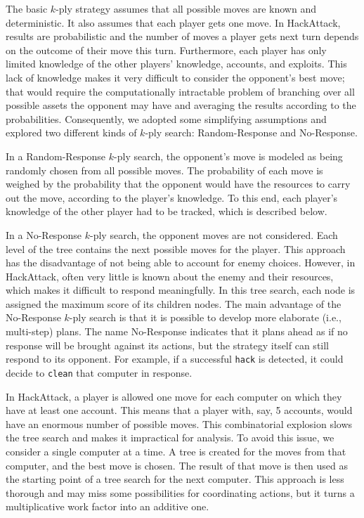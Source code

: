 The basic $k$-ply strategy assumes that all possible moves are known and deterministic. It also assumes that each player gets one move. In HackAttack, results are probabilistic and the number of moves a player gets next turn depends on the outcome of their move this turn. Furthermore, each player has only limited knowledge of the other players' knowledge, accounts, and exploits. This lack of knowledge makes it very difficult to consider the opponent's best move; that would require the computationally intractable problem of branching over all possible assets the opponent may have and averaging the results according to the probabilities. Consequently, we adopted some simplifying assumptions and explored two different kinds of $k$-ply search: Random-Response and No-Response.

In a Random-Response $k$-ply search, the opponent's move is modeled as being randomly chosen from all possible moves. The probability of each move is weighed by the probability that the opponent would have the resources to carry out the move, according to the player's knowledge. To this end, each player's knowledge of the other player had to be tracked, which is described below.

In a No-Response $k$-ply search, the opponent moves are not considered. Each level of the tree contains the next possible moves for the player. This approach has the disadvantage of not being able to account for enemy choices. However, in HackAttack, often very little is known about the enemy and their resources, which makes it difficult to respond meaningfully. In this tree search, each node is assigned the maximum score of its children nodes. The main advantage of the No-Response $k$-ply search is that it is possible to develop more elaborate (i.e., multi-step) plans.
The name No-Response indicates that it plans ahead as if no response will be brought against its actions, but the strategy itself can still respond to its opponent. 
For example, if a successful {\tt hack} is detected, it could decide to {\tt clean} that computer in response.
 
In HackAttack, a player is allowed one move for each computer on which they have at least one account. This means that a player with, say, 5 accounts, would have an enormous number of possible moves. This combinatorial explosion slows the tree search and makes it impractical for analysis. To avoid this issue, we consider a single computer at a time. A tree is created for the moves from that computer, and the best move is chosen. The result of that move is then used as the starting point of a tree search for the next computer. This approach is less thorough and may miss some possibilities for coordinating actions, but it turns a multiplicative work factor into an additive one. 

